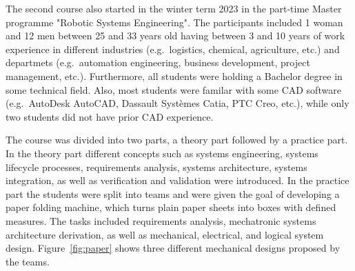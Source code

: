 \documentclass{PDS}
\begin{document}
The second course also started in the winter term 2023 in the part-time Master programme "Robotic Systems Engineering".
The participants included 1 woman and 12 men between 25 and 33 years old having between 3 and 10 years of work experience in different industries (e.g.\ logistics, chemical, agriculture, etc.) and departmets (e.g.\ automation engineering, business development, project management, etc.).
Furthermore, all students were holding a Bachelor degree in some technical field.
Also, most students were familar with some CAD software (e.g.\ AutoDesk AutoCAD, Dassault Systèmes Catia, PTC Creo, etc.), while only two students did not have prior CAD experience.

The course was divided into two parts, a theory part followed by a practice part.
In the theory part different concepts such as systems engineering, systems lifecycle processes, requirements analysis, systems architecture, systems integration, as well as verification and validation were introduced.
In the practice part the students were split into teams and were given the goal of developing a paper folding machine, which turns plain paper sheets into boxes with defined measures.
The tasks included requirements analysis, mechatronic systems architecture derivation, as well as mechanical, electrical, and logical system design.
Figure~\ref{fig:paper} shows three different mechanical designs proposed by the teams.
\end{document}

